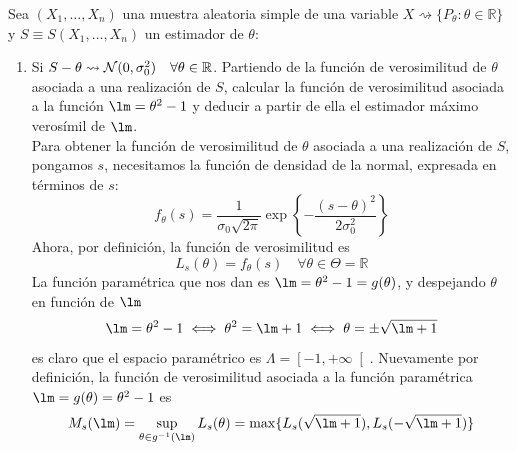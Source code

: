 \documentclass[12pt]{article}
\newcommand{\R}{\mathbb{R}}
\begin{document}
    \newpage

    \begin{ejercicio}[1.85 puntos]
        Sea $(X_1,\ldots,X_n)$ una muestra aleatoria simple de una variable $X\rightsquigarrow \{P_\theta:\theta \in \mathbb{R}\}$ y $S\equiv S(X_1,\ldots,X_n)$ un estimador de $\theta$:
        \begin{enumerate}[label=\alph*)]
            \item Si $S-\theta\rightsquigarrow \mathcal{N}(0,\sigma_0^2)\quad \forall \theta\in \mathbb{R}$. Partiendo de la función de verosimilitud de $\theta$ asociada a una realización de $S$, 
            calcular la función de verosimilitud asociada a la función $\lm = \theta^2-1$ y deducir a partir de ella el estimador máximo verosímil de $\lm$. \\

            Para obtener la función de verosimilitud de $\theta$ asociada a una realización de $S$, pongamos $s$, necesitamos la función de densidad de la normal, expresada en términos de $s$:
            $$f_\theta(s) = \dfrac{1}{\sigma_0 \sqrt{2 \pi}} \exp \left\{ - \dfrac{(s-\theta)^2}{2 \sigma_0^2}\right\}$$
            Ahora, por definición, la función de verosimilitud es
            $$L_s(\theta) = f_\theta(s) \quad \forall \theta \in \Theta = \R$$
            La función paramétrica que nos dan es $\lm = \theta^2 - 1 = g(\theta)$, y despejando $\theta$ en función de $\lm$ $$\lm = \theta^2 - 1 \iff \theta^2 = \lm + 1 \iff \theta = \pm \sqrt{\lm + 1}$$ 
            es claro que el espacio paramétrico es $\Lambda = \left[-1, +\infty \right[$. Nuevamente por definición, la función de verosimilitud asociada a la función paramétrica $\lm = g(\theta) = \theta^2 - 1$ es
            $$M_s(\lm) = \sup_{\theta \in g^{-1}(\lm)} L_s(\theta) = \max \{L_s(\sqrt{\lm+1}), L_s(-\sqrt{\lm+1})\}$$


\end{enumerate}
\end{ejercicio}
\end{document}
